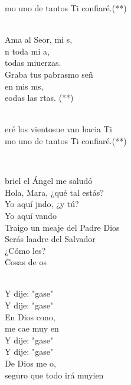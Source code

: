 \documentclass[12pt]{article}
\begin{document}
\begin{multicols*}{2}
\begin{cancion}[Hacia Ti][Ixcís]
\begin{chorus}
	mo uno de tantos Ti confiaré.(**)\\
	\end{chorus}%
	\jump\\
	Ama al Seor, mi s, \\
	n toda mi a, \\
	 todas miuerzas.\\
	Graba tus pabrasmo señ  \\
	en mis ms, \\
	eodas las rtas. (**)\\\jump\\
	\begin{chorus}%
	eré los vientosue van hacia Ti\\
	mo uno de tantos Ti confiaré.(**)\\
	\end{chorus}%
	\jump\\
\end{cancion}%

\begin{cancion}[Hágase][Migueli]%
	briel el Ángel me saludó\\
	Hola, Mara, ¿qué tal estás?\\
	Yo aquí jndo, ¿y tú?\\
	Yo aquí vando\\
\jump
	Traigo un meaje del Padre Dios\\
	Serás laadre del Salvador\\
	¿Cómo les?\\
	Cosas de os\\\jump\\
	\begin{chorus}%
	Y dije: "gase" \\
	Y dije: "gase" \\
	En Dios cono, \\
	me cae muy en\\
	Y dije: "gase" \\
	Y dije: "gase" \\
	De Dios me o,\\
	seguro que todo irá muyien\\
	\end{chorus}%
	\jump\\
\end{cancion}%


\end{multicols*}
\end{document}
